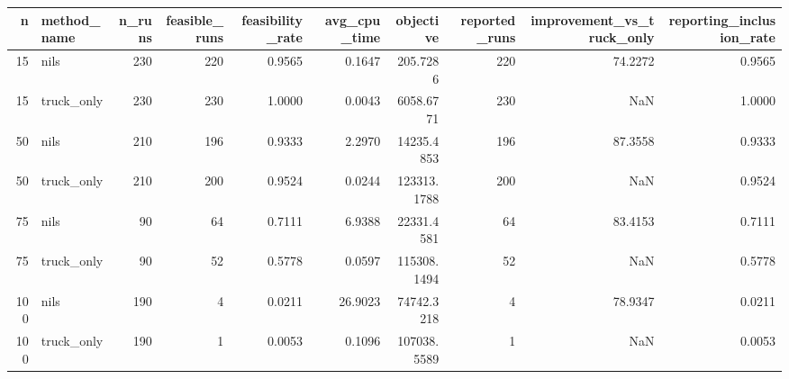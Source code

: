 \begin{tabular}{rlrrrrrrrr}
\toprule
n & method_name & n_runs & feasible_runs & feasibility_rate & avg_cpu_time & objective & reported_runs & improvement_vs_truck_only & reporting_inclusion_rate \\
\midrule
15 & nils & 230 & 220 & 0.9565 & 0.1647 & 205.7286 & 220 & 74.2272 & 0.9565 \\
15 & truck_only & 230 & 230 & 1.0000 & 0.0043 & 6058.6771 & 230 & NaN & 1.0000 \\
50 & nils & 210 & 196 & 0.9333 & 2.2970 & 14235.4853 & 196 & 87.3558 & 0.9333 \\
50 & truck_only & 210 & 200 & 0.9524 & 0.0244 & 123313.1788 & 200 & NaN & 0.9524 \\
75 & nils & 90 & 64 & 0.7111 & 6.9388 & 22331.4581 & 64 & 83.4153 & 0.7111 \\
75 & truck_only & 90 & 52 & 0.5778 & 0.0597 & 115308.1494 & 52 & NaN & 0.5778 \\
100 & nils & 190 & 4 & 0.0211 & 26.9023 & 74742.3218 & 4 & 78.9347 & 0.0211 \\
100 & truck_only & 190 & 1 & 0.0053 & 0.1096 & 107038.5589 & 1 & NaN & 0.0053 \\
\bottomrule
\end{tabular}

